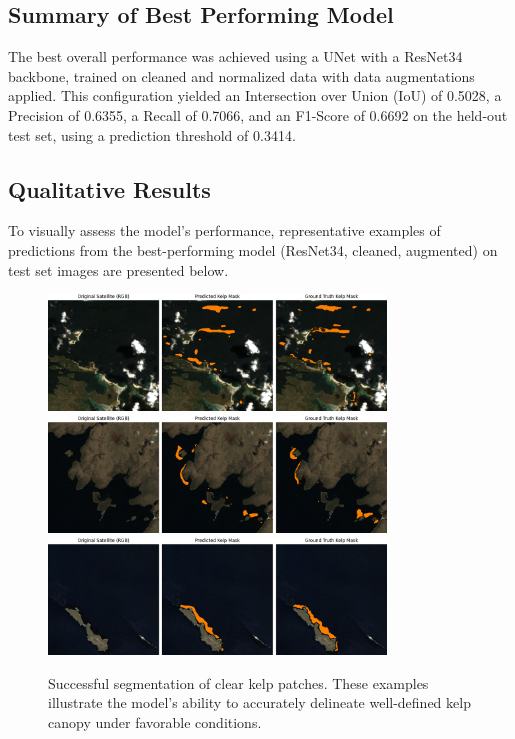 \documentclass{article}
\begin{document}
\subsection{Summary of Best Performing Model} %

The best overall performance was achieved using a UNet with a ResNet34 backbone, trained on cleaned and normalized data with data augmentations applied. This configuration yielded an Intersection over Union (IoU) of 0.5028, a Precision of 0.6355, a Recall of 0.7066, and an F1-Score of 0.6692 on the held-out test set, using a prediction threshold of 0.3414.

\newpage

\subsection{Qualitative Results} %

To visually assess the model's performance, representative examples of predictions from the best-performing model (ResNet34, cleaned, augmented) on test set images are presented below.

\begin{figure}[htbp]
    \centering
    \includegraphics[width=0.8\textwidth]{good2.png} %
    \includegraphics[width=0.8\textwidth]{good3.png}
    \includegraphics[width=0.8\textwidth]{good1.png}
    \caption{Successful segmentation of clear kelp patches. These examples illustrate the model's ability to accurately delineate well-defined kelp canopy under favorable conditions.}
    \label{fig:good_segmentation}
\end{figure}
\end{document}
